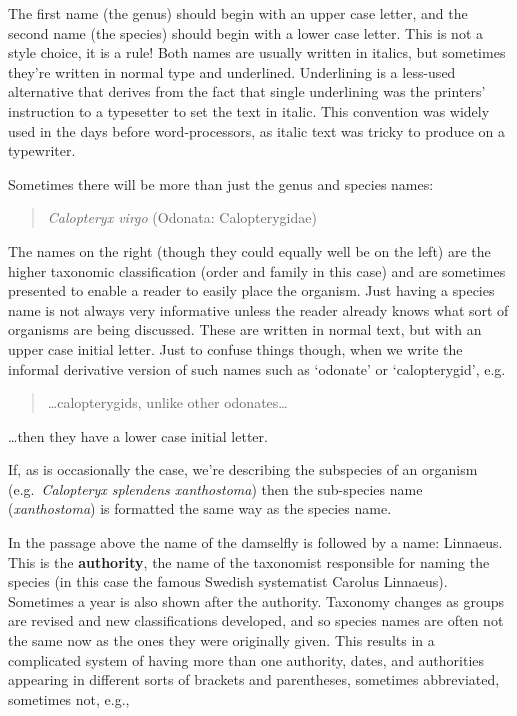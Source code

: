 \documentclass[
]{book}
\begin{document}
The first name (the genus) should begin with an upper case letter, and the second name (the species) should begin with a lower case letter. This is not a style choice, it is a rule! Both names are usually written in italics, but sometimes they're written in normal type and underlined. Underlining is a less-used alternative that derives from the fact that single underlining was the printers' instruction to a typesetter to set the text in italic. This convention was widely used in the days before word-processors, as italic text was tricky to produce on a typewriter.

Sometimes there will be more than just the genus and species names:

\begin{quote}
\emph{Calopteryx virgo} (Odonata: Calopterygidae)
\end{quote}

The names on the right (though they could equally well be on the left) are the higher taxonomic classification (order and family in this case) and are sometimes presented to enable a reader to easily place the organism. Just having a species name is not always very informative unless the reader already knows what sort of organisms are being discussed. These are written in normal text, but with an upper case initial letter. Just to confuse things though, when we write the informal derivative version of such names such as `odonate' or `calopterygid', e.g.

\begin{quote}
\ldots calopterygids, unlike other odonates\ldots{}
\end{quote}

\ldots then they have a lower case initial letter.

If, as is occasionally the case, we're describing the subspecies of an organism (e.g.~\emph{Calopteryx splendens xanthostoma}) then the sub-species name (\emph{xanthostoma}) is formatted the same way as the species name.

In the passage above the name of the damselfly is followed by a name: Linnaeus. This is the \textbf{authority}, the name of the taxonomist responsible for naming the species (in this case the famous Swedish systematist Carolus Linnaeus). Sometimes a year is also shown after the authority. Taxonomy changes as groups are revised and new classifications developed, and so species names are often not the same now as the ones they were originally given. This results in a complicated system of having more than one authority, dates, and authorities appearing in different sorts of brackets and parentheses, sometimes abbreviated, sometimes not, e.g.,
\end{document}
